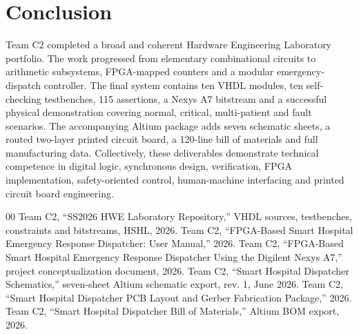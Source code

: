 \documentclass[conference]{IEEEtran}
\begin{document}
\section{Conclusion}
Team C2 completed a broad and coherent Hardware Engineering Laboratory portfolio. The work progressed from elementary combinational circuits to arithmetic subsystems, FPGA-mapped counters and a modular emergency-dispatch controller. The final system contains ten VHDL modules, ten self-checking testbenches, 115 assertions, a Nexys A7 bitstream and a successful physical demonstration covering normal, critical, multi-patient and fault scenarios. The accompanying Altium package adds seven schematic sheets, a routed two-layer printed circuit board, a 120-line bill of materials and full manufacturing data. Collectively, these deliverables demonstrate technical competence in digital logic, synchronous design, verification, FPGA implementation, safety-oriented control, human-machine interfacing and printed circuit board engineering.

\begin{thebibliography}{00}
 Team C2, ``SS2026 HWE Laboratory Repository,'' VHDL sources, testbenches, constraints and bitstreams, HSHL, 2026.
 Team C2, ``FPGA-Based Smart Hospital Emergency Response Dispatcher: User Manual,'' 2026.
 Team C2, ``FPGA-Based Smart Hospital Emergency Response Dispatcher Using the Digilent Nexys A7,'' project conceptualization document, 2026.
 Team C2, ``Smart Hospital Dispatcher Schematics,'' seven-sheet Altium schematic export, rev. 1, June 2026.
 Team C2, ``Smart Hospital Dispatcher PCB Layout and Gerber Fabrication Package,'' 2026.
 Team C2, ``Smart Hospital Dispatcher Bill of Materials,'' Altium BOM export, 2026.
\end{thebibliography}
\end{document}
